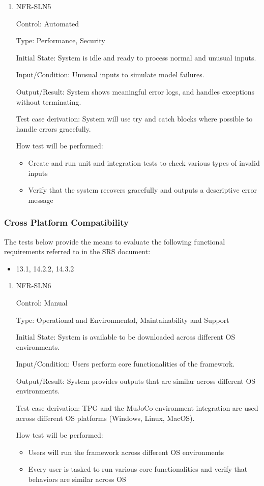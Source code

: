 \documentclass[12pt, titlepage]{article}
\begin{document}
\begin{enumerate}
\item NFR-SLN5

Control: Automated

Type: Performance, Security

Initial State: System is idle and ready to process normal and unusual inputs.

Input/Condition: Unusual inputs to simulate model failures.

Output/Result: System shows meaningful error logs, and handles exceptions without terminating.

Test case derivation: System will use try and catch blocks where possible to handle errors gracefully.

How test will be performed:
\begin{itemize}
  \item Create and run unit and integration tests to check various types of invalid inputs
  \item Verify that the system recovers gracefully and outputs a descriptive error message
\end{itemize}

\end{enumerate}

\subsubsection{Cross Platform Compatibility}

The tests below provide the means to evaluate the following functional requirements referred to in the SRS document:
\begin{itemize}
  \item 13.1, 14.2.2, 14.3.2
\end{itemize}

\begin{enumerate}
\item NFR-SLN6

Control: Manual

Type: Operational and Environmental, Maintainability and Support

Initial State: System is available to be downloaded across different OS environments.

Input/Condition: Users perform core functionalities of the framework.

Output/Result: System provides outputs that are similar across different OS environments.

Test case derivation: TPG and the MuJoCo environment integration are used across different OS platforms (Windows, Linux, MacOS).

How test will be performed:
\begin{itemize}
  \item Users will run the framework across different OS environments
  \item Every user is tasked to run various core functionalities and verify that behaviors are similar across OS
\end{itemize}

\end{enumerate}
\end{document}
